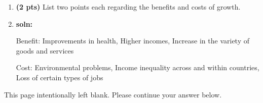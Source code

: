 \documentclass[14pt, oneside]{memoir}
\begin{document}
\begin{enumerate}[label=\textbf{\arabic*.}, itemsep=15pt]
\begin{enumerate}[label=(\alph*)]
	
	\clearpage
	\item \textbf{(2 pts)} List two points each regarding the benefits and costs of growth.
	\vspace{1cm}
	\item[] \textbf{soln:} 
	
	Benefit: Improvements in health, Higher incomes, Increase in the variety of goods and services
	
	Cost: Environmental problems, Income inequality across and within countries, Loss of certain types of jobs
	
\end{enumerate}


\newpage
\begin{center}
	This page intentionally left blank. Please continue your answer below.
\end{center}
\vspace*{\fill}
%
\vspace*{\fill}

\end{enumerate}
  
\end{document}

